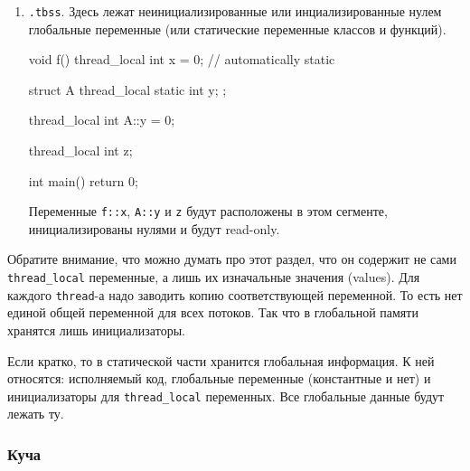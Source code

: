 \documentclass{article}
\begin{document}
\begin{enumerate}
\begin{enumerate}
\begin{cppcode}[numbers = none]
struct A {
  thread_local static int y;
};

thread_local int A::y = 42;

thread_local int z = 42;

int main() {
  return 0;
}
\end{cppcode}
Переменные \verb"f::x", \verb"A::y" и \verb"z" будут расположены в этом сегменте, инициализированы указанными значениями и будут read-only.

\item \verb".tbss".
Здесь лежат неинициализированные или инциализированные нулем глобальные переменные (или статические переменные классов и функций).
\begin{cppcode}[numbers = none]
void f() {
  thread_local int x = 0; // automatically static
}

struct A {
  thread_local static int y;
};

thread_local int A::y = 0;

thread_local int z;

int main() {
  return 0;
}
\end{cppcode}
Переменные \verb"f::x", \verb"A::y" и \verb"z" будут расположены в этом сегменте, инициализированы нулями и будут read-only.
\end{enumerate}
Обратите внимание, что можно думать про этот раздел, что он содержит не сами \verb"thread_local" переменные, а лишь их изначальные значения (values).
Для каждого \verb"thread"-а надо заводить копию соответствующей переменной.
То есть нет единой общей переменной для всех потоков.
Так что в глобальной памяти хранятся лишь инициализаторы.
\end{enumerate}
Если кратко, то в статической части хранится глобальная информация.
К ней относятся: исполняемый код, глобальные переменные (константные и нет) и инициализаторы для \verb"thread_local" переменных.
Все глобальные данные будут лежать ту.

\subsubsection{Куча}
\end{document}
